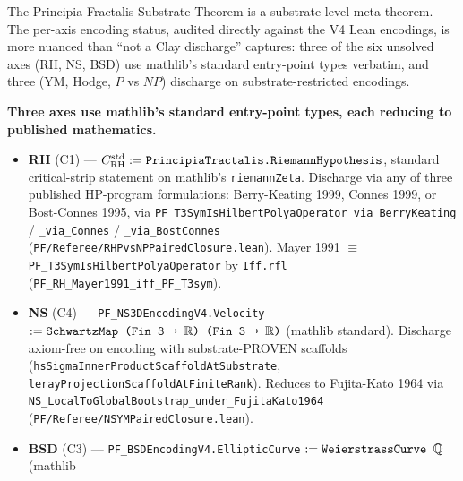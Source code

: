 \begin{warning}
The Principia Fractalis Substrate Theorem is a
substrate-level meta-theorem. The per-axis encoding status,
audited directly against the V4 Lean encodings, is more
nuanced than ``not a Clay discharge'' captures: three of the
six unsolved axes (RH, NS, BSD) use mathlib's standard
entry-point types verbatim, and three (YM, Hodge, $P$ vs $NP$)
discharge on substrate-restricted encodings.

\textbf{Three axes use mathlib's standard entry-point types,
each reducing to published mathematics.}
\begin{itemize}
\item \textbf{RH} (C1) --- $C^{\mathrm{std}}_{\mathrm{RH}} :=
\texttt{Principia\allowbreak{}Tractalis.\allowbreak{}Riemann\allowbreak{}Hypothesis}$, standard
critical-strip statement on mathlib's \texttt{riemannZeta}.
Discharge via any of three published HP-program formulations:
Berry-Keating 1999, Connes 1999, or Bost-Connes 1995, via
\texttt{PF\_\allowbreak{}T3Sym\allowbreak{}Is\allowbreak{}Hilbert\allowbreak{}Polya\allowbreak{}Operator\_\allowbreak{}via\_\allowbreak{}BerryKeating} /
\texttt{\_via\_Connes} / \texttt{\_via\_BostConnes}
(\texttt{PF/\allowbreak{}Referee/\allowbreak{}RHPvs\allowbreak{}NPPaired\allowbreak{}Closure.\allowbreak{}lean}). Mayer 1991
$\equiv$ \texttt{PF\_\allowbreak{}T3Sym\allowbreak{}Is\allowbreak{}Hilbert\allowbreak{}Polya\allowbreak{}Operator} by \texttt{Iff.rfl}
(\texttt{PF\_\allowbreak{}RH\_\allowbreak{}Mayer1991\_\allowbreak{}iff\_\allowbreak{}PF\_\allowbreak{}T3sym}).
\item \textbf{NS} (C4) --- \texttt{PF\_NS3DEncodingV4.Velocity}
$:= \texttt{SchwartzMap (Fin 3 → \ensuremath{\mathbb{R}}) (Fin 3 → \ensuremath{\mathbb{R}})}$
(mathlib standard). Discharge axiom-free on encoding with
substrate-PROVEN scaffolds
(\texttt{hs\allowbreak{}Sigma\allowbreak{}Inner\allowbreak{}Product\allowbreak{}Scaffold\allowbreak{}At\allowbreak{}Substrate},
\texttt{leray\allowbreak{}Projection\allowbreak{}Scaffold\allowbreak{}At\allowbreak{}Finite\allowbreak{}Rank}). Reduces to
Fujita-Kato 1964 via \texttt{NS\_\allowbreak{}Local\allowbreak{}To\allowbreak{}Global\allowbreak{}Bootstrap\_\allowbreak{}under\_\allowbreak{}FujitaKato1964}
(\texttt{PF/\allowbreak{}Referee/\allowbreak{}NSYMPaired\allowbreak{}Closure.\allowbreak{}lean}).
\item \textbf{BSD} (C3) --- \texttt{PF\_\allowbreak{}BSDEncodingV4.\allowbreak{}EllipticCurve}
$:= \texttt{WeierstrassCurve \ensuremath{\mathbb{Q}}}$ (mathlib

\end{itemize}
\end{warning}
